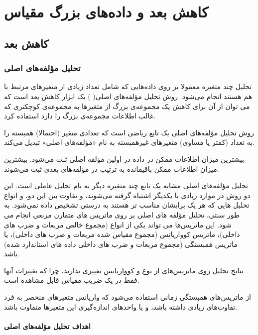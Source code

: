 \chapter{
کاهش بعد و داده‌های بزرگ مقیاس
}


\section{
کاهش بعد
}
\subsection{
تحلیل مؤلفه‌های اصلی
}

تحلیل چند متغیره معمولا بر روی داده‌هایی که شامل تعداد زیادی از متغیرهای مرتبط با هم هستند انجام می‌شود.
روش تحلیل مؤلفه‌های اصلی(
)%
 یک ابزار کاهش بعد است که می توان از آن برای کاهش یک مجموعه‌ی بزرگ از متغیرها به مجموعه‌ی کوچکتری که غالب اطلاعات مجموعه‌ی بزرگ را دارد استفاده کرد.

روش تحلیل مؤلفه‌های اصلی یک تابع ریاضی است که تعدادی متغیر (احتمالا) همبسته را به تعداد (کمتر یا مساوی) متغیرهای غیرهمبسته به نام «مؤلفه‌های اصلی» تبدیل می‌کند.

بیشترین میزان اطلاعات ممکن در داده در اولین مؤلفه اصلی ثبت می‌شود. بیشترین میزان اطلاعات ممکن باقیمانده به ترتیب در مؤلفه‌های بعدی ثبت می‌شوند.

تحلیل مؤلفه‌های اصلی مشابه یک تابع چند متغیره دیگر به نام تحلیل عاملی است. این دو روش در موارد زیادی با یکدیگر اشتباه گرفته می‌شوند، و تفاوت بین این دو، و انواع تحلیل هایی که هر یک برایشان مناسب تر هستند به درستی تشخیص داده نمی‌شود.
به طور سنتی، تحلیل مؤلفه های اصلی بر روی ماتریس های متقارن مربعی انجام می شود. این ماتریس‌ها می تواند یکی از انواع
%
 (مجموع خالص مربعات و ضرب های داخلی)، ماتریس کوواریانس%
 (مجموع مقیاس شده مربعات و ضرب های داخلی)، یا ماتریس همبستگی%
 (مجموع مربعات و ضرب های داخلی داده های استاندارد شده) باشد.

نتایج تحلیل روی ماتریس‌های از نوع
 و کوواریانس تغییری ندارند، چرا که تغییرات آنها فقط در یک ضریب مقیاس قابل مشاهده است.

از ماتریس‌های همبستگی زمانی استفاده می‌شود که واریانس متغیرهای منحصر به فرد تفاوت‌های زیادی داشته باشد، ‌و یا واحد‌های اندازه‌گیری این متغیرها متفاوت باشد.

\subsubsection{
اهداف تحلیل مؤلفه‌های اصلی   
}

